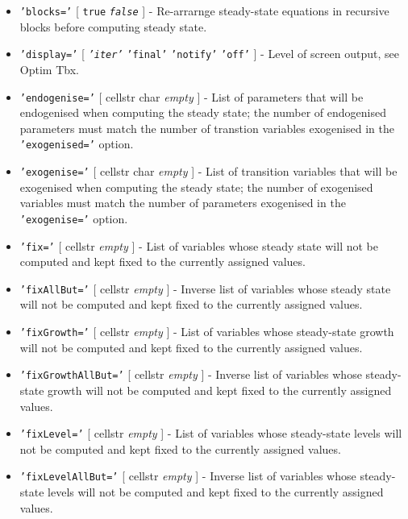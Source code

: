  \begin{itemize}
 \item
   \texttt{'blocks='} {[} \texttt{true} \textbar{} \emph{\texttt{false}}
   {]} - Re-arrarnge steady-state equations in recursive blocks before
   computing steady state.
 \item
   \texttt{'display='} {[} \emph{\texttt{'iter'}} \textbar{}
   \texttt{'final'} \textbar{} \texttt{'notify'} \textbar{}
   \texttt{'off'} {]} - Level of screen output, see Optim Tbx.
 \item
   \texttt{'endogenise='} {[} cellstr \textbar{} char \textbar{}
   \emph{empty} {]} - List of parameters that will be endogenised when
   computing the steady state; the number of endogenised parameters must
   match the number of transtion variables exogenised in the
   \texttt{'exogenised='} option.
 \item
   \texttt{'exogenise='} {[} cellstr \textbar{} char \textbar{}
   \emph{empty} {]} - List of transition variables that will be
   exogenised when computing the steady state; the number of exogenised
   variables must match the number of parameters exogenised in the
   \texttt{'exogenise='} option.
 \item
   \texttt{'fix='} {[} cellstr \textbar{} \emph{empty} {]} - List of
   variables whose steady state will not be computed and kept fixed to
   the currently assigned values.
 \item
   \texttt{'fixAllBut='} {[} cellstr \textbar{} \emph{empty} {]} -
   Inverse list of variables whose steady state will not be computed and
   kept fixed to the currently assigned values.
 \item
   \texttt{'fixGrowth='} {[} cellstr \textbar{} \emph{empty} {]} - List
   of variables whose steady-state growth will not be computed and kept
   fixed to the currently assigned values.
 \item
   \texttt{'fixGrowthAllBut='} {[} cellstr \textbar{} \emph{empty} {]} -
   Inverse list of variables whose steady-state growth will not be
   computed and kept fixed to the currently assigned values.
 \item
   \texttt{'fixLevel='} {[} cellstr \textbar{} \emph{empty} {]} - List of
   variables whose steady-state levels will not be computed and kept
   fixed to the currently assigned values.
 \item
   \texttt{'fixLevelAllBut='} {[} cellstr \textbar{} \emph{empty} {]} -
   Inverse list of variables whose steady-state levels will not be
   computed and kept fixed to the currently assigned values.

\end{itemize}
